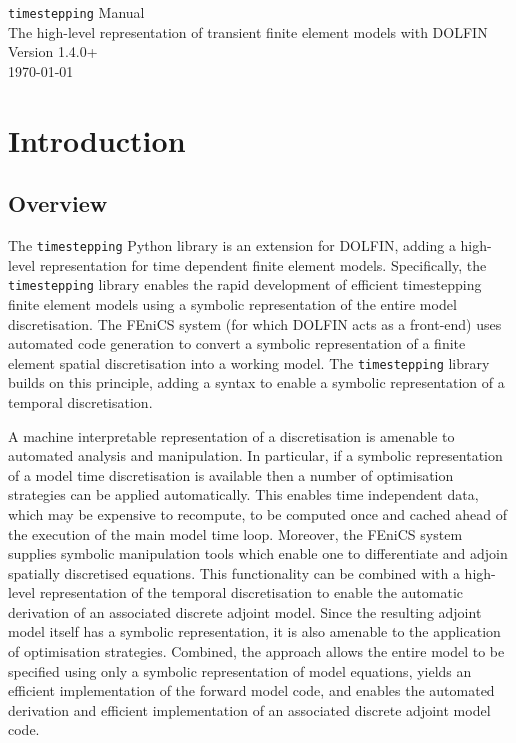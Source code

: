 \documentclass[a4paper]{book}
\newcommand{\version}{1.4.0+}
\begin{document}
\begin{titlepage}
\begin{center}

\Huge{\verb+timestepping+ Manual} \\[0.02\textheight]
\large{The high-level representation of transient finite element models with DOLFIN} \\[0.02\textheight]
\Huge{Version \version} \\[0.15\textheight]
\vfill
\large{\today}

\end{center}
\end{titlepage}

\tableofcontents

\chapter{Introduction}

\section{Overview}

The \verb+timestepping+ Python library is an extension for DOLFIN, adding a
high-level representation for time dependent finite element models.
Specifically, the \verb+timestepping+ library enables the rapid development of
efficient timestepping finite element models using a symbolic representation of
the entire model discretisation. The FEniCS system (for which DOLFIN acts as a
front-end) uses automated code generation to convert a symbolic representation
of a finite element spatial discretisation into a working model. The
\verb+timestepping+ library builds on this principle, adding a syntax to enable
a symbolic representation of a temporal discretisation.

A machine interpretable representation of a discretisation is amenable to
automated analysis and manipulation. In particular, if a symbolic representation
of a model time discretisation is available then a number of optimisation
strategies can be applied automatically. This enables time independent data,
which may be expensive to recompute, to be computed once and cached ahead of the
execution of the main model time loop. Moreover, the FEniCS system supplies
symbolic manipulation tools which enable one to differentiate and adjoin
spatially discretised equations. This functionality can be combined with a
high-level representation of the temporal discretisation to enable the automatic
derivation of an associated discrete adjoint model. Since the resulting adjoint
model itself has a symbolic representation, it is also amenable to the
application of optimisation strategies. Combined, the approach allows the entire
model to be specified using only a symbolic representation of model equations,
yields an efficient implementation of the forward model code, and enables the
automated derivation and efficient implementation of an associated discrete
adjoint model code.
\end{document}
